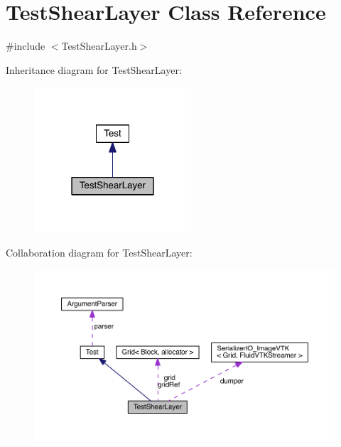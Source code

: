 \hypertarget{class_test_shear_layer}{}\section{Test\+Shear\+Layer Class Reference}
\label{class_test_shear_layer}


{\ttfamily \#include $<$Test\+Shear\+Layer.\+h$>$}



Inheritance diagram for Test\+Shear\+Layer\+:\nopagebreak
\begin{figure}[H]
\begin{center}
\leavevmode
\includegraphics[width=166pt]{d5/daa/class_test_shear_layer__inherit__graph}
\end{center}
\end{figure}


Collaboration diagram for Test\+Shear\+Layer\+:\nopagebreak
\begin{figure}[H]
\begin{center}
\leavevmode
\includegraphics[width=350pt]{d5/d8e/class_test_shear_layer__coll__graph}
\end{center}
\end{figure}
